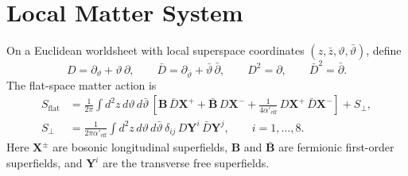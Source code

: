 \documentclass[11pt]{article}
\newcommand{\Aeff}{\alpha'_{\mathrm{eff}}}
\begin{document}
\section{Local Matter System}
On a Euclidean worldsheet with local superspace coordinates $(z,\bar z,\vartheta,\bar\vartheta)$, define
\begin{equation}\label{eq:superderivatives}
D=\partial_\vartheta+\vartheta\,\partial,
\qquad
\bar D=\partial_{\bar\vartheta}+\bar\vartheta\,\bar\partial,
\qquad
D^2=\partial,
\qquad
\bar D^2=\bar\partial.
\end{equation}
The flat-space matter action is
\begin{equation}\label{eq:flat-action}
\begin{aligned}
S_{\mathrm{flat}}
&=
\frac{1}{2\pi}\int d^2z\,d\vartheta\,d\bar\vartheta\,
\left[
\mathbf B\,\bar D\mathbf X^+
+\bar{\mathbf B}\,D\mathbf X^-
+\frac{1}{4\Aeff}\,D\mathbf X^+\,\bar D\mathbf X^-
\right]
+S_\perp,
\\
S_\perp
&=
\frac{1}{2\pi \Aeff}\int d^2z\,d\vartheta\,d\bar\vartheta\,
\delta_{ij}\,D\mathbf Y^i\,\bar D\mathbf Y^j,
\qquad i=1,\dots,8.
\end{aligned}
\end{equation}
Here $\mathbf X^\pm$ are bosonic longitudinal superfields, $\mathbf B$ and $\bar{\mathbf B}$ are fermionic first-order superfields, and $\mathbf Y^i$ are the transverse free superfields.
\end{document}
